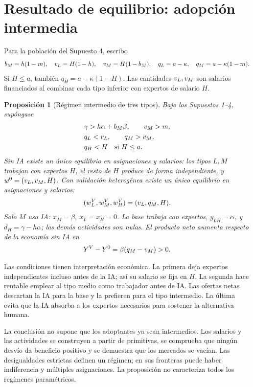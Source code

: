 \documentclass[11pt]{article}
\newtheorem{proposition}{Proposición}\newtheorem{assumption}{Supuesto}
\begin{document}
\section{Resultado de equilibrio: adopción intermedia}
Para la población del Supuesto 4, escribo
\[
 b_M=h(1-m),\quad v_L=H(1-h),\quad v_M=H(1-b_M),\quad
 q_L=a-\kappa,\quad q_M=a-\kappa(1-m).
\]
Si $H\leq a$, también $q_H=a-\kappa(1-H)$. Las cantidades $v_L,v_M$ son salarios financiados al combinar cada tipo inferior con expertos de salario $H$.

\begin{proposition}[Régimen intermedio de tres tipos]\label{prop:middle}
Bajo los Supuestos 1--4, supóngase
\begin{align}
 &\gamma>h\alpha+b_M\beta,\qquad v_M>m,\label{eq:surplus}\\
 &q_L<v_L,\qquad q_M>v_M,\label{eq:offers}\\
 &q_H<H\quad\text{si }H\leq a.\label{eq:high}
\end{align}
Sin IA existe un único equilibrio en asignaciones y salarios: los tipos $L,M$ trabajan con expertos $H$, el resto de $H$ produce de forma independiente, y $w^0=(v_L,v_M,H)$. Con validación heterogénea existe un único equilibrio en asignaciones y salarios:
\begin{equation}\label{eq:prices3}
 (w^V_L,w^V_M,w^V_H)=(v_L,q_M,H).
\end{equation}
Solo $M$ usa IA: $x_M=\beta$, $x_L=x_H=0$. La base trabaja con expertos, $y_{LH}=\alpha$, y $d_H=\gamma-h\alpha$; las demás actividades son nulas. El producto neto aumenta respecto de la economía sin IA en
\begin{equation}\label{eq:gain}
 Y^V-Y^0=\beta(q_M-v_M)>0.
\end{equation}
\end{proposition}
Las condiciones tienen interpretación económica. La primera deja expertos independientes incluso antes de la IA; así su salario se fija en $H$. La segunda hace rentable emplear al tipo medio como trabajador antes de IA. Las ofertas netas descartan la IA para la base y la prefieren para el tipo intermedio. La última evita que la IA absorba a los expertos necesarios para sostener la alternativa humana.

La conclusión no supone que los adoptantes ya sean intermedios. Los salarios y las actividades se construyen a partir de primitivas, se comprueba que ningún desvío da beneficio positivo y se demuestra que los mercados se vacían. Las desigualdades estrictas definen un régimen; en sus fronteras puede haber indiferencia y múltiples asignaciones. La proposición no caracteriza todos los regímenes paramétricos.
\end{document}
